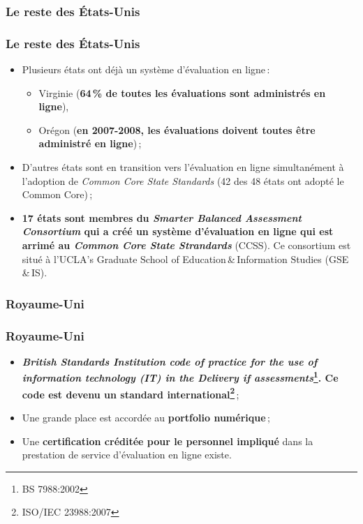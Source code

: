 \documentclass{beamer}
\begin{document}
			\subsubsection{Le reste des États-Unis} 
				\begin{frame}[allowframebreaks]
					  \frametitle{Le reste des États-Unis \citep{NorthCarolina2013}}
				 	\begin {itemize}
						\item Plusieurs états ont déjà un système d'évaluation en ligne\,:
							\begin {itemize}
								\item Virginie (\textbf{64\,\% de toutes les évaluations sont administrés en ligne}),
								\item Orégon (\textbf{en 2007-2008, les évaluations doivent toutes être administré en ligne})\,;
							\end{itemize}
						\framebreak
						\item D'autres états sont en transition vers l'évaluation en ligne simultanément à l'adoption de \textit{Common Core State Standards} (42 des 48 états ont adopté le Common Core)\,;
						\item \textbf{17 états sont membres du \textit{Smarter Balanced Assessment Consortium} qui a créé un système d'évaluation en ligne qui est arrimé au \textit{Common Core State Strandards}} (CCSS). Ce consortium est situé à l'UCLA’s Graduate School of Education\,\&\,Information Studies (GSE\,\&\,IS).
					\end{itemize}					
				\end{frame}
				
			\subsubsection{Royaume-Uni} 
				\begin{frame}
					  \frametitle{Royaume-Uni \citep{authority2014a}}
				 	\begin {itemize}
						\item \textbf{\textit{British Standards Institution code of practice for the use of information technology (IT) in the Delivery if assessments}\footnote{BS 7988:2002}. Ce code est devenu un standard international\footnote{ISO/IEC 23988:2007}}\,;
						\item Une grande place est accordée au \textbf{portfolio numérique}\,;
						\item Une \textbf{certification créditée pour le personnel impliqué} dans la prestation de service d'évaluation en ligne existe.
					\end{itemize}					
				\end{frame}
				
\end{document}
